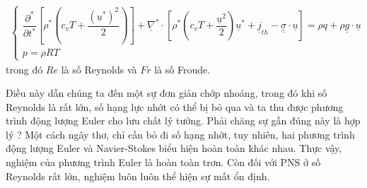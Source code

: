 \begin{description}
\[\begin{aligned}
\begin{cases}
                    \dfrac{\partial^*}{\partial t^*}\left[\rho^*\left(c_vT+\dfrac{(\underline{u}^*)^2}{2}\right)\right]+\underline{\nabla}^*\cdot\left[\rho^*\left(c_vT+\dfrac{\underline{u}^2}{2}\right)\underline{u}^*+\underline{j}_{th}-\underline{\underline{\sigma}}\cdot\underline{u}\right]=\rho q + \rho\underline{g}\cdot\underline{u}\\[10pt]
                    p = \rho RT
                \end{cases}
            \end{aligned}
        \]
	trong đó $Re$ là số Reynolds và $Fr$ là số Froude.
	
	Điều này dẫn chúng ta đến một sự đơn giản chớp nhoáng, trong đó khi số Reynolds là rất lớn, số hạng lực nhớt có thể bị bỏ qua và ta thu được phương trình động lượng Euler cho lưu chất lý tưởng. Phải chăng sự gần đúng này là hợp lý ? Một cách ngây thơ, chỉ cần bỏ đi số hạng nhớt, tuy nhiên, hai phương trình động lượng Euler và Navier-Stokes biểu hiện hoàn toàn khác nhau. Thực vậy, nghiệm của phương trình Euler là hoàn toàn trơn. Còn đối với PNS ở số Reynolds rất lớn, nghiệm luôn luôn thể hiện sự mất ổn định.
\end{description}
